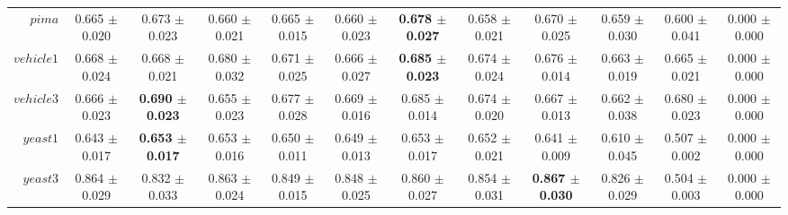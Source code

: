 \begin{table}[!ht]
{\begin{tabular}{r c c c c c c c c c c c}
$pima$ & 0.665 $\pm$ 0.020 & 0.673 $\pm$ 0.023 & 0.660 $\pm$ 0.021 & 0.665 $\pm$ 0.015 & 0.660 $\pm$ 0.023 & \textbf{0.678 $\pm$ 0.027} & 0.658 $\pm$ 0.021 & 0.670 $\pm$ 0.025 & 0.659 $\pm$ 0.030 & 0.600 $\pm$ 0.041 & 0.000 $\pm$ 0.000 \\
$vehicle1$ & 0.668 $\pm$ 0.024 & 0.668 $\pm$ 0.021 & 0.680 $\pm$ 0.032 & 0.671 $\pm$ 0.025 & 0.666 $\pm$ 0.027 & \textbf{0.685 $\pm$ 0.023} & 0.674 $\pm$ 0.024 & 0.676 $\pm$ 0.014 & 0.663 $\pm$ 0.019 & 0.665 $\pm$ 0.021 & 0.000 $\pm$ 0.000 \\
$vehicle3$ & 0.666 $\pm$ 0.023 & \textbf{0.690 $\pm$ 0.023} & 0.655 $\pm$ 0.023 & 0.677 $\pm$ 0.028 & 0.669 $\pm$ 0.016 & 0.685 $\pm$ 0.014 & 0.674 $\pm$ 0.020 & 0.667 $\pm$ 0.013 & 0.662 $\pm$ 0.038 & 0.680 $\pm$ 0.023 & 0.000 $\pm$ 0.000 \\
$yeast1$ & 0.643 $\pm$ 0.017 & \textbf{0.653 $\pm$ 0.017} & 0.653 $\pm$ 0.016 & 0.650 $\pm$ 0.011 & 0.649 $\pm$ 0.013 & 0.653 $\pm$ 0.017 & 0.652 $\pm$ 0.021 & 0.641 $\pm$ 0.009 & 0.610 $\pm$ 0.045 & 0.507 $\pm$ 0.002 & 0.000 $\pm$ 0.000 \\
$yeast3$ & 0.864 $\pm$ 0.029 & 0.832 $\pm$ 0.033 & 0.863 $\pm$ 0.024 & 0.849 $\pm$ 0.015 & 0.848 $\pm$ 0.025 & 0.860 $\pm$ 0.027 & 0.854 $\pm$ 0.031 & \textbf{0.867 $\pm$ 0.030} & 0.826 $\pm$ 0.029 & 0.504 $\pm$ 0.003 & 0.000 $\pm$ 0.000 \\
\end{tabular}}
\end{table}
